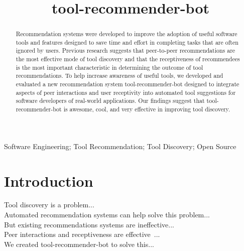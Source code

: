 \documentclass[conference]{IEEEtran}
\newcommand{\tool}{tool-recommender-bot }
\begin{document}

\title{\tool}

\author{
}

\maketitle
\begin{abstract}
Recommendation systems were developed to improve the adoption of useful software tools and features designed to save time and effort in completing tasks that are often ignored by users. Previous research suggests that peer-to-peer recommendations are the most effective mode of tool discovery and that the receptiveness of recommendees is the most important characteristic in determining the outcome of tool recommendations. To help increase awareness of useful tools, we developed and evaluated a new recommendation system \tool designed to integrate aspects of peer interactions and user receptivity into automated tool suggestions for software developers of real-world applications. Our findings suggest that \tool is awesome, cool, and very effective in improving tool discovery.
\end{abstract}

\begin{IEEEkeywords}
Software Engineering; Tool Recommendation; Tool Discovery; Open Source
\end{IEEEkeywords}

\section{Introduction}
Tool discovery is a problem... \\

Automated recommendation systems can help solve this problem... \\

But existing recommendations systems are ineffective... \\

Peer interactions and receptiveness are effective~\cite{vlhcc17}... \\

We created \tool to solve this... \\
\end{document}
